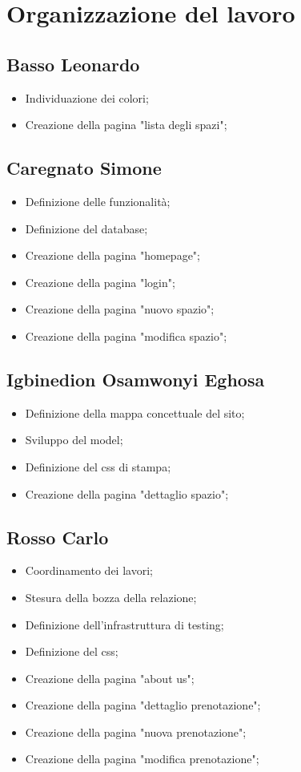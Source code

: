 \section{Organizzazione del lavoro}

\subsection{Basso Leonardo}
\begin{itemize}
	\item Individuazione dei colori;
	\item Creazione della pagina "lista degli spazi";
\end{itemize}

\subsection{Caregnato Simone}
\begin{itemize}
	\item Definizione delle funzionalità;
	\item Definizione del database;
	\item Creazione della pagina "homepage";
	\item Creazione della pagina "login";
	\item Creazione della pagina "nuovo spazio";
	\item Creazione della pagina "modifica spazio";
\end{itemize}

\subsection{Igbinedion Osamwonyi Eghosa}
\begin{itemize}
	\item Definizione della mappa concettuale del sito;
	\item Sviluppo del model;
	\item Definizione del css di stampa;
	\item Creazione della pagina "dettaglio spazio";
\end{itemize}

\subsection{Rosso Carlo}
\begin{itemize}
	\item Coordinamento dei lavori;
	\item Stesura della bozza della relazione;
	\item Definizione dell'infrastruttura di testing;
	\item Definizione del css;
	\item Creazione della pagina "about us";
	\item Creazione della pagina "dettaglio prenotazione";
	\item Creazione della pagina "nuova prenotazione";
	\item Creazione della pagina "modifica prenotazione";
\end{itemize}

